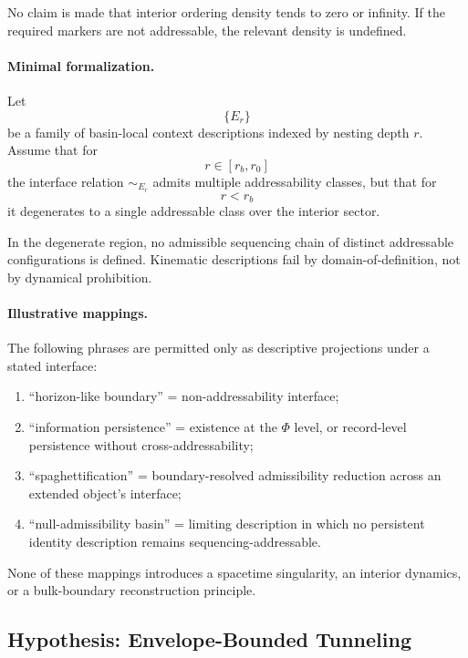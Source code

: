 \documentclass[aps,prx,onecolumn,11pt]{revtex4-2}
\theoremstyle{plain}
\theoremstyle{definition}
\theoremstyle{remark}
\begin{document}
No claim is made that interior ordering density tends to zero or
infinity. If the required markers are not addressable, the relevant
density is undefined.

\paragraph{Minimal formalization.}

Let
\[
\{E_r\}
\]
be a family of basin-local context descriptions indexed by nesting depth
\(r\). Assume that for
\[
r\in[r_b,r_0]
\]
the interface relation \(\sim_{E_r}\) admits multiple addressability
classes, but that for
\[
r<r_b
\]
it degenerates to a single addressable class over the interior sector.

In the degenerate region, no admissible sequencing chain of distinct
addressable configurations is defined. Kinematic descriptions fail by
domain-of-definition, not by dynamical prohibition.

\paragraph{Illustrative mappings.}

The following phrases are permitted only as descriptive projections
under a stated interface:

\begin{enumerate}[label=(\roman*), leftmargin=2.2em]
\item ``horizon-like boundary'' = non-addressability interface;
\item ``information persistence'' = existence at the \(\Phi\) level,
or record-level persistence without cross-addressability;
\item ``spaghettification'' = boundary-resolved admissibility reduction
across an extended object's interface;
\item ``null-admissibility basin'' = limiting description in which no
persistent identity description remains sequencing-addressable.
\end{enumerate}

None of these mappings introduces a spacetime singularity, an interior
dynamics, or a bulk-boundary reconstruction principle.

\subsection{Hypothesis: Envelope-Bounded Tunneling}
\label{subsec:hyp_envelope_tunneling}
\end{document}
